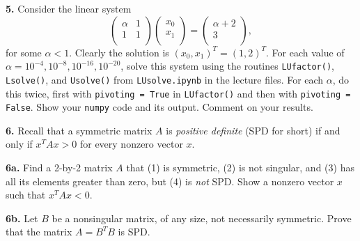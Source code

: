\documentclass[11pt]{article}
\begin{document}
\par\bigskip
{\bf 5.} Consider the linear system
$$
   \left(
   \begin{array}{cc}
      \alpha & 1 \\ 	
           1 & 1 \\ 	
   \end{array} \right)
   \left(
   \begin{array}{c}
      x_0 \\ 	
      x_1 \\ 	
   \end{array} \right)
   =
   \left(
   \begin{array}{cc}
      \alpha + 2 \\ 	
               3 \\ 	
   \end{array} \right),
$$
for some $\alpha < 1$.
Clearly the solution is $(x_0, x_1)^T = (1,2)^T$.
For each value of $\alpha = 10^{-4}, 10^{-8}, 10^{-16}, 10^{-20}$,
solve this system using the routines {\tt LUfactor()}, {\tt Lsolve()}, 
and {\tt Usolve()} from {\tt LUsolve.ipynb} in the lecture files.
For each $\alpha$, do this twice, first with {\tt pivoting = True} in {\tt LUfactor()}
and then with {\tt pivoting = False}.
Show your {\tt numpy} code and its output.
Comment on your results.


\par\bigskip
{\bf 6.} Recall that a symmetric matrix $A$ is {\em positive definite}
(SPD for short) if and only if $x^TAx>0$ for every nonzero vector $x$.

\par\medskip
{\bf 6a.} Find a 2-by-2 matrix $A$ that (1) is symmetric, (2) is not singular,
and (3) has all its elements greater than zero, but (4) is {\em not} SPD.
Show a nonzero vector $x$ such that $x^TAx<0$.

\par\medskip
{\bf 6b.} Let $B$ be a nonsingular matrix, of any size, 
not necessarily symmetric.
Prove that the matrix $A=B^TB$ is SPD.
\end{document}
